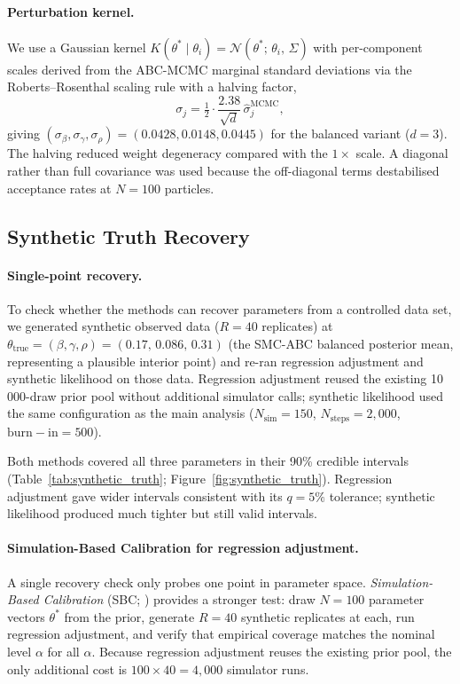 \documentclass[11pt, a4paper]{article}
\begin{document}
\paragraph{Perturbation kernel.}
We use a Gaussian kernel $K(\theta^* \mid \theta_i) = \mathcal{N}(\theta^*;\,\theta_i,\,\Sigma)$
\citep{beaumont2009} with per-component scales derived from the ABC-MCMC marginal
standard deviations via the Roberts--Rosenthal scaling rule with a halving factor,
\[
  \sigma_j = \tfrac{1}{2}\cdot\frac{2.38}{\sqrt{d}}\,\hat\sigma^\mathrm{MCMC}_j,
\]
giving $(\sigma_\beta,\sigma_\gamma,\sigma_\rho)=(0.0428,0.0148,0.0445)$ for the
balanced variant ($d=3$).
The halving reduced weight degeneracy compared with the $1\times$ scale.
A diagonal rather than full covariance was used because the off-diagonal terms
destabilised acceptance rates at $N=100$ particles.

\subsection{Synthetic Truth Recovery}
\label{sec:synthetic_truth}

\paragraph{Single-point recovery.}
To check whether the methods can recover parameters from a controlled data set,
we generated synthetic observed data ($R=40$ replicates) at
$\theta_\mathrm{true}=(\beta,\gamma,\rho)=(0.17,\,0.086,\,0.31)$
(the SMC-ABC balanced posterior mean, representing a plausible interior point)
and re-ran regression adjustment and synthetic likelihood on those data.
Regression adjustment reused the existing 10\,000-draw prior pool without additional
simulator calls; synthetic likelihood used the same configuration as the main analysis
($N_\mathrm{sim}=150$, $N_\mathrm{steps}=2{,}000$, $\mathrm{burn{-}in}=500$).

Both methods covered all three parameters in their 90\% credible intervals
(Table~\ref{tab:synthetic_truth}; Figure~\ref{fig:synthetic_truth}).
Regression adjustment gave wider intervals consistent with its $q=5\%$ tolerance;
synthetic likelihood produced much tighter but still valid intervals.

\paragraph{Simulation-Based Calibration for regression adjustment.}
A single recovery check only probes one point in parameter space.
\emph{Simulation-Based Calibration} (SBC; \citep{talts2018}) provides a stronger
test: draw $N=100$ parameter vectors $\theta^\ast$ from the prior, generate $R=40$
synthetic replicates at each, run regression adjustment, and verify that empirical
coverage matches the nominal level $\alpha$ for all $\alpha$.
Because regression adjustment reuses the existing prior pool, the only additional
cost is $100\times 40 = 4{,}000$ simulator runs.
\end{document}
